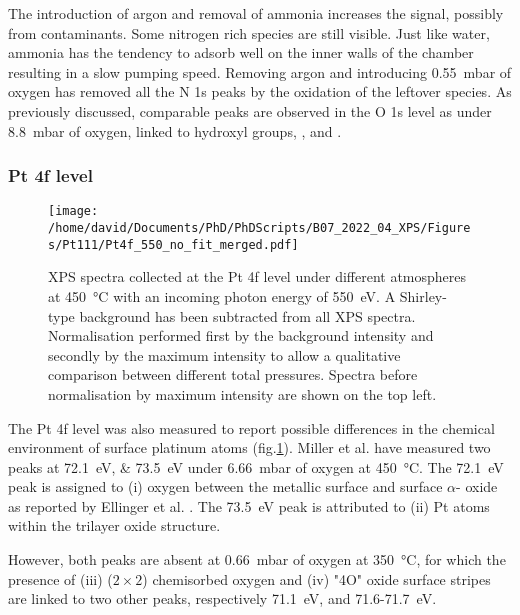 The introduction of argon and removal of ammonia increases the  signal, possibly from contaminants.
Some nitrogen rich species are still visible.
Just like water, ammonia has the tendency to adsorb well on the inner walls of the chamber resulting in a slow pumping speed.
Removing argon and introducing \qty{0.55}{\milli\bar} of oxygen has removed all the N 1s peaks by the oxidation of the leftover  species.
As previously discussed, comparable peaks are observed in the O 1s level as under \qty{8.8}{\milli\bar} of oxygen, linked to hydroxyl groups, , and .

\subsubsection{Pt 4f level}

\begin{figure}[!htb]
    \centering
    \texttt{[image: /home/david/Documents/PhD/PhDScripts/B07\_2022\_04\_XPS/Figures/Pt111/Pt4f\_550\_no\_fit\_merged.pdf]}
    \caption{
        XPS spectra collected at the Pt 4f level under different atmospheres at \qty{450}{\degreeCelsius} with an incoming photon energy of \qty{550}{\eV}.
        A Shirley-type background has been subtracted from all XPS spectra.
        Normalisation performed first by the background intensity and secondly by the maximum intensity to allow a qualitative comparison between different total pressures.
        Spectra before normalisation by maximum intensity are shown on the top left.
    }
    \label{fig:Pt4fPt111}
\end{figure}

The Pt 4f level was also measured to report possible differences in the chemical environment of surface platinum atoms (fig.\ref{fig:Pt4fPt111}).
Miller et al. \parencite*{Miller2011} have measured two peaks at \qtylist{72.1;73.5}{\eV} under \qty{6.66}{\milli\bar} of oxygen at \qty{450}{\degreeCelsius}.
The \qty{72.1}{\eV} peak is assigned to (i) oxygen between the metallic surface and surface $\alpha$- oxide as reported by Ellinger et al. \parencite*{Ellinger2008}.
The \qty{73.5}{\eV} peak is attributed to (ii) Pt atoms within the trilayer oxide structure.

However, both peaks are absent at \qty{0.66}{\milli\bar} of oxygen at \qty{350}{\degreeCelsius}, for which the presence of (iii) ($2\times2$) chemisorbed oxygen and (iv) "4O" oxide surface stripes are linked to two other peaks, respectively \qty{71.1}{\eV}, and \num{71.6}-\qty{71.7}{\eV}.

